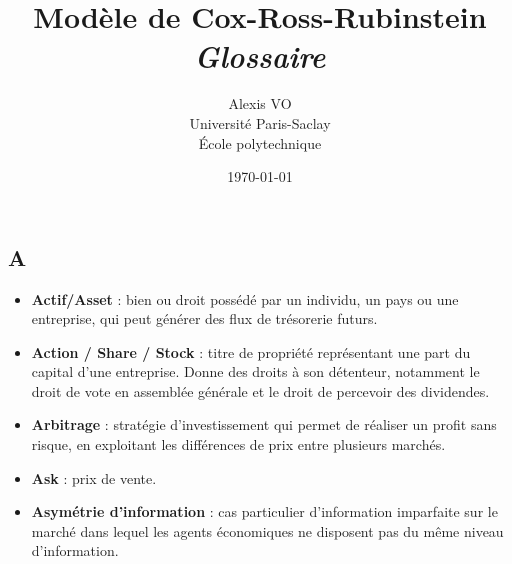 \documentclass[a4paper,10pt]{article}
\title{\Huge{\textbf{Modèle de Cox-Ross-Rubinstein}}\\ \medskip
      \Huge{\textit{Glossaire}}\vspace*{0.7cm}}
\author{\LARGE{Alexis VO}\vspace{1cm}\\ \medskip
      Université Paris-Saclay\\École polytechnique}
\date{\vspace{0.2cm}\today}
\begin{document}
\vspace{\fill}
  \maketitle
\vspace{\fill}

\newpage

\tableofcontents

\newpage

\begin{multicols}{2}

\section*{A}
\begin{itemize}
  \item \textbf{Actif/Asset} : bien ou droit possédé par un individu, un pays ou une entreprise, qui peut générer des flux de trésorerie futurs.
  \item \textbf{Action / Share / Stock} : titre de propriété représentant une part du capital d’une entreprise. Donne des droits à son détenteur, notamment le droit de vote en assemblée générale et le droit de percevoir des dividendes.
  \item \textbf{Arbitrage} : stratégie d’investissement qui permet de réaliser un profit sans risque, en exploitant les différences de prix entre plusieurs marchés.
  \item \textbf{Ask} : prix de vente.
  \item \textbf{Asymétrie d'information} : cas particulier d'information imparfaite sur le marché dans lequel les agents économiques ne disposent pas du même niveau d'information.
\end{itemize}


\end{multicols}
\end{document}
